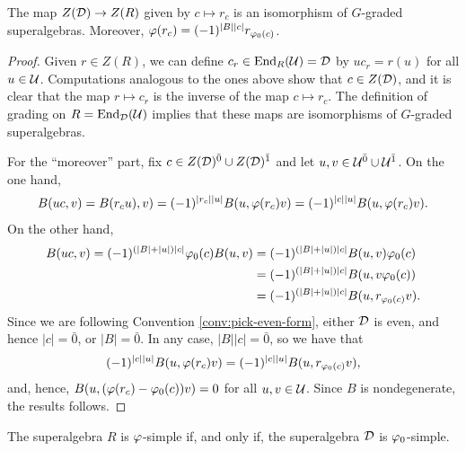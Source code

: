 \begin{prop}%
	The map $Z(\mathcal{D}) \to Z(R)$ given by $c \mapsto r_c$ is an isomorphism of $G$-graded superalgebras.
	Moreover, $\varphi (r_c) = (-1)^{|B||c|} r_{\varphi_0(c)}$. 
\end{prop}

\begin{proof}
	Given $r\in Z(R)$, we can define $c_r\in \operatorname{End}_R (\mathcal U) =\mathcal{D}$ by $uc_r = r(u)$ for all $u\in \mathcal U$.
	Computations analogous to the ones above show that $c\in Z(\mathcal{D})$, and it is clear that the map $r\mapsto c_r$ is the inverse of the map $c \mapsto r_c$.
	The definition of grading on $R = \operatorname{End}_{\mathcal{D}} (\mathcal U)$ implies that these maps are isomorphisms of $G$-graded superalgebras.

	For the ``moreover'' part, fix $c\in Z(\mathcal{D})^{\bar0} \cup Z(\mathcal{D})^{\bar1}$ and let $u, v \in \mathcal U^{\bar0} \cup \mathcal U^{\bar1}$.
	On the one hand,
	\begin{align*}
		B(uc,v) = B(r_c u), v) = (-1)^{|r_c||u|} B(u, \varphi(r_c) v) = (-1)^{|c||u|} B(u, \varphi(r_c) v).
	\end{align*}
	On the other hand,
	\begin{align*}
		B(uc, v) = (-1)^{(|B| + |u|) |c|} \varphi_0(c) B(u, v) & = (-1)^{(|B| + |u|) |c|} B(u, v) \varphi_0(c)     \\
		                                                     & = (-1)^{(|B| + |u|) |c|} B(u, v \varphi_0(c) )    \\
		                                                     & = (-1)^{(|B| + |u|) |c|} B(u, r_{\varphi_0(c)}v).
	\end{align*}
	Since we are following Convention \ref{conv:pick-even-form}, either $\mathcal{D}$ is even, and hence $|c| = \bar 0$, or
	$|B| = \bar 0$.
	In any case, $|B||c| = \bar 0$, so we have that \[(-1)^{|c||u|} B(u, \varphi(r_c) v) = (-1)^{|c||u|} B(u, r_{\varphi_0(c)}v),\] and, hence, $B(u, (\varphi(r_c) - \varphi_0(c)) v) = 0$ for all $u, v \in \mathcal U$.
	Since $B$ is nondegenerate, the results follows.
\end{proof}

\begin{prop}\label{prop:vphi-R-simple-D-simple}
	The superalgebra $R$ is $\varphi$-simple if, and only if, the superalgebra $\mathcal{D}$ is $\varphi_0$-simple.
\end{prop}


